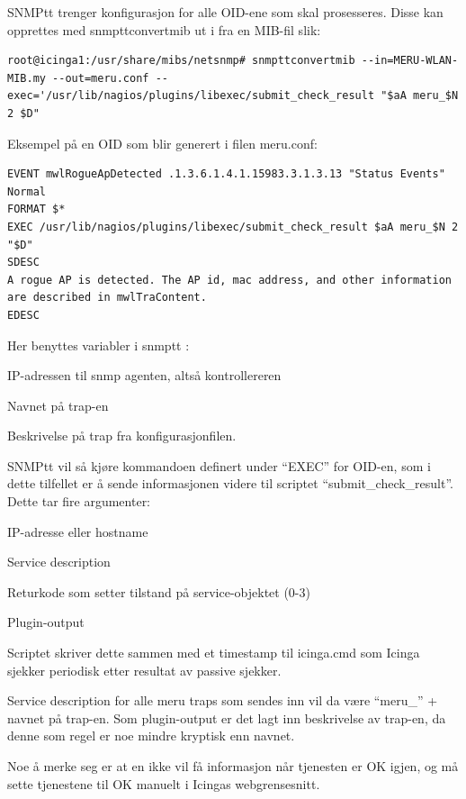 SNMPtt trenger konfigurasjon for alle OID-ene som skal prosesseres. Disse kan opprettes med snmpttconvertmib ut i fra en MIB-fil slik:

\begin{lstlisting}[style=example]
root@icinga1:/usr/share/mibs/netsnmp# snmpttconvertmib --in=MERU-WLAN-MIB.my --out=meru.conf --exec='/usr/lib/nagios/plugins/libexec/submit_check_result "$aA meru_$N 2 $D"
\end{lstlisting}

Eksempel på en OID som blir generert i filen meru.conf:

\begin{lstlisting}[style=example]
EVENT mwlRogueApDetected .1.3.6.1.4.1.15983.3.1.3.13 "Status Events" Normal
FORMAT $*
EXEC /usr/lib/nagios/plugins/libexec/submit_check_result $aA meru_$N 2 "$D"
SDESC
A rogue AP is detected. The AP id, mac address, and other information are described in mwlTraContent.
EDESC
\end{lstlisting}

Her benyttes variabler i snmptt \cite{snmptrans}:
\begin{itemize*}
	\item IP-adressen til snmp agenten, altså kontrollereren
	\item Navnet på trap-en
	\item Beskrivelse på trap fra konfigurasjonfilen.
\end{itemize*}

SNMPtt vil så kjøre kommandoen definert under ``EXEC'' for OID-en, som i dette tilfellet er å sende informasjonen videre til scriptet ``submit\_check\_result''. Dette tar fire argumenter:

\begin{itemize*}
	\item IP-adresse eller hostname 
	\item Service description
	\item Returkode som setter tilstand på service-objektet (0-3)
	\item Plugin-output
\end{itemize*}
Scriptet skriver dette sammen med et timestamp til icinga.cmd som Icinga sjekker periodisk etter resultat av passive sjekker.

Service description for alle meru traps som sendes inn vil da være ``meru\_'' + navnet på trap-en. Som plugin-output er det lagt inn beskrivelse av trap-en, da denne som regel er noe mindre kryptisk enn navnet.

Noe å merke seg er at en ikke vil få informasjon når tjenesten er OK igjen, og må sette tjenestene til OK manuelt i Icingas webgrensesnitt.


